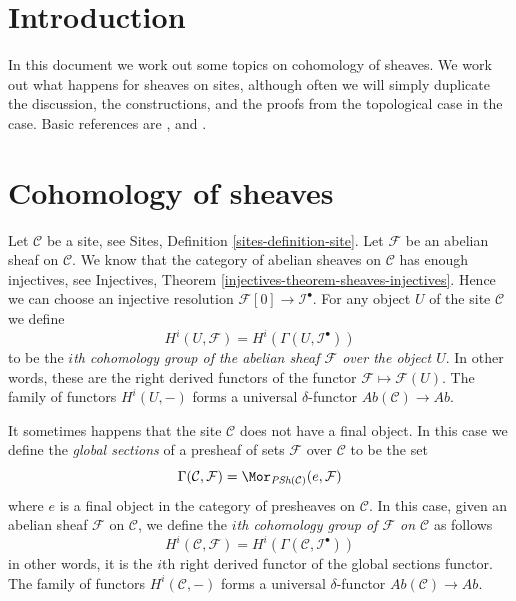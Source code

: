 \section{Introduction}
\label{sites-cohomology-section-introduction}
In this document we work out some topics on cohomology of sheaves.
We work out what happens for sheaves on sites,
although often we will simply duplicate the discussion,
the constructions, and the proofs from the topological
case in the case.
Basic references are \cite{SGA4}, \cite{Godement} and \cite{Iversen}.

\section{Cohomology of sheaves}
\label{sites-cohomology-section-cohomology-sheaves}
Let $\mathcal{C}$ be a site, see
Sites, Definition \ref{sites-definition-site}.
Let $\mathcal{F}$ be an abelian sheaf on $\mathcal{C}$.
We know that the category of abelian sheaves on $\mathcal{C}$
has enough injectives, see
Injectives, Theorem \ref{injectives-theorem-sheaves-injectives}.
Hence we can choose an injective resolution
$\mathcal{F}[0] \to \mathcal{I}^\bullet$.
For any object $U$ of the site $\mathcal{C}$ we define
\begin{equation}
\label{equation-cohomology-object-site}
H^i(U, \mathcal{F}) = H^i(\Gamma(U, \mathcal{I}^\bullet))
\end{equation}
to be the {\it $i$th cohomology group of the abelian sheaf
$\mathcal{F}$ over the object $U$}. In other words, these are the
right derived functors of the functor $\mathcal{F} \mapsto \mathcal{F}(U)$.
The family of functors $H^i(U, -)$ forms a universal $\delta$-functor
$\textit{Ab}(\mathcal{C}) \to \textit{Ab}$.

\medskip\noindent
It sometimes happens that
the site $\mathcal{C}$ does not have a final object. In this
case we define the {\it global sections} of a presheaf
of sets $\mathcal{F}$ over $\mathcal{C}$ to be the set
\begin{equation}
\label{equation-global-sections}
\Gamma(\mathcal{C}, \mathcal{F}) =
\Mor_{\textit{PSh}(\mathcal{C})}(e, \mathcal{F})
\end{equation}
where $e$ is a final object in the category of presheaves on $\mathcal{C}$.
In this case, given an abelian sheaf $\mathcal{F}$ on $\mathcal{C}$,
we define the {\it $i$th cohomology group of $\mathcal{F}$ on $\mathcal{C}$}
as follows
\begin{equation}
\label{equation-cohomology}
H^i(\mathcal{C}, \mathcal{F}) = H^i(\Gamma(\mathcal{C}, \mathcal{I}^\bullet))
\end{equation}
in other words, it is the $i$th right derived functor of the
global sections functor.
The family of functors $H^i(\mathcal{C}, -)$ forms a universal $\delta$-functor
$\textit{Ab}(\mathcal{C}) \to \textit{Ab}$.

